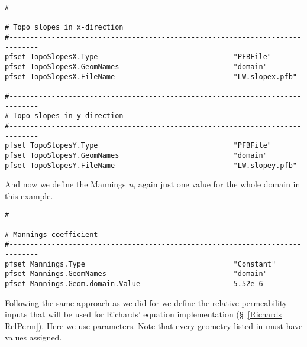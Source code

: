 \begin{verbatim}
#-----------------------------------------------------------------------------
# Topo slopes in x-direction
#-----------------------------------------------------------------------------
pfset TopoSlopesX.Type                                "PFBFile"
pfset TopoSlopesX.GeomNames                           "domain"
pfset TopoSlopesX.FileName                            "LW.slopex.pfb"

#-----------------------------------------------------------------------------
# Topo slopes in y-direction
#-----------------------------------------------------------------------------
pfset TopoSlopesY.Type                                "PFBFile"
pfset TopoSlopesY.GeomNames                           "domain"
pfset TopoSlopesY.FileName                            "LW.slopey.pfb"
\end{verbatim}

And now we define the Mannings \emph{n}, again just one value for the whole domain in this example. 

\begin{verbatim}
#-----------------------------------------------------------------------------
# Mannings coefficient
#-----------------------------------------------------------------------------
pfset Mannings.Type                                   "Constant"
pfset Mannings.GeomNames                              "domain"
pfset Mannings.Geom.domain.Value                      5.52e-6
\end{verbatim}

Following the same approach as we did for  we define the relative permeability
inputs that will be used for Richards' equation implementation (\S~\ref{Richards RelPerm}).
Here we use  parameters. Note that every geometry listed in  must have 
values assigned. 

